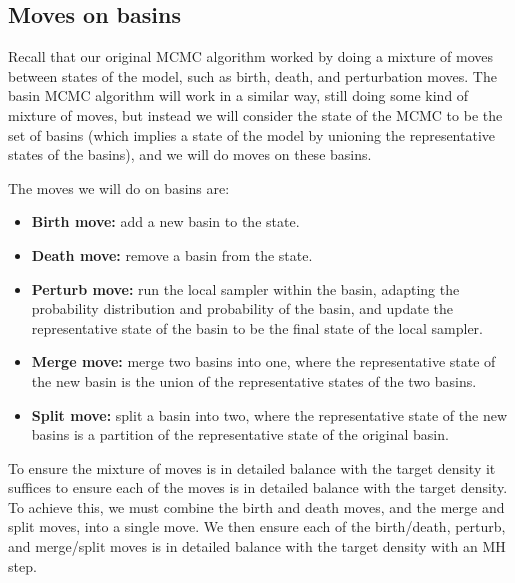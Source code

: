 \documentclass[12pt]{article}
\theoremstyle{definition}
\theoremstyle{remark}
\theoremstyle{plain}
\begin{document}
\subsection{Moves on basins}
Recall that our original MCMC algorithm worked by doing a mixture of moves between states of the model, 
such as birth, death, and perturbation moves. The basin MCMC algorithm will work in a similar way, 
still doing some kind of mixture of moves, but instead we will consider the state of the MCMC 
to be the set of basins (which implies a state of the model by unioning the representative states of the basins), 
and we will do moves on these basins.

The moves we will do on basins are:
\begin{itemize}
    \item \textbf{Birth move:} add a new basin to the state.
    \item \textbf{Death move:} remove a basin from the state.
    \item \textbf{Perturb move:} run the local sampler within the basin, adapting the probability distribution and probability of the basin, 
    and update the representative state of the basin to be the final state of the local sampler.
    \item \textbf{Merge move:} merge two basins into one, where the representative state of the new basin is the union of the representative states of the two basins.
    \item \textbf{Split move:} split a basin into two, where the representative state of the new basins is a partition of the representative state of the original basin.
\end{itemize}

To ensure the mixture of moves is in detailed balance with the target density 
it suffices to ensure each of the moves is in detailed balance with the target density.
To achieve this, we must combine the birth and death moves, and the merge and split moves, into a single move. 
We then ensure each of the birth/death, perturb, and merge/split moves is in detailed balance with the target density
with an MH step.
\end{document}

